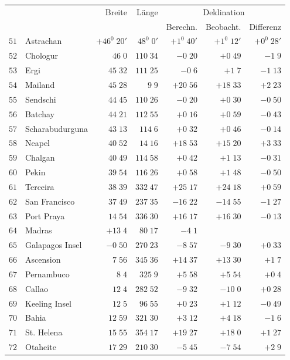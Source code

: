 \clearpage
{}
\begingroup
\fontsize{9}{10.2}\selectfont
\setlength{\tabcolsep}{2.5pt}
\renewcommand{\arraystretch}{1.02}
\begin{center}
\begin{tabular}{rl|r|r||r|r|r}
\hline
&&Breite&Länge&\multicolumn{3}{c}{Deklination}\\
&&&&Berechn.&Beobacht.&Differenz\\\hline
$51$&Astrachan&$+46^0\;20'$&$48^0\;0'$&$+1^0\;40'$&$+1^0\;12'$&$+0^0\;28'$\\
$52$&Chologur&$46\;0$&$110\;34$&$-0\;20$&$+0\;49$&$-1\;9$\\
$53$&Ergi&$45\;32$&$111\;25$&$-0\;6$&$+1\;7$&$-1\;13$\\
$54$&Mailand&$45\;28$&$9\;9$&$+20\;56$&$+18\;33$&$+2\;23$\\
$55$&Sendschi&$44\;45$&$110\;26$&$-0\;20$&$+0\;30$&$-0\;50$\\
$56$&Batchay&$44\;21$&$112\;55$&$+0\;16$&$+0\;59$&$-0\;43$\\
$57$&Scharabudurguna&$43\;13$&$114\;6$&$+0\;32$&$+0\;46$&$-0\;14$\\
$58$&Neapel&$40\;52$&$14\;16$&$+18\;53$&$+15\;20$&$+3\;33$\\
$59$&Chalgan&$40\;49$&$114\;58$&$+0\;42$&$+1\;13$&$-0\;31$\\
$60$&Pekin&$39\;54$&$116\;26$&$+0\;58$&$+1\;48$&$-0\;50$\\[2pt]
$61$&Terceira&$38\;39$&$332\;47$&$+25\;17$&$+24\;18$&$+0\;59$\\
$62$&San Francisco&$37\;49$&$237\;35$&$-16\;22$&$-14\;55$&$-1\;27$\\
$63$&Port Praya&$14\;54$&$336\;30$&$+16\;17$&$+16\;30$&$-0\;13$\\
$64$&Madras&$+13\;4$&$80\;17$&$-4\;1$&&\\
$65$&Galapagos Insel&$-0\;50$&$270\;23$&$-8\;57$&$-9\;30$&$+0\;33$\\
$66$&Ascension&$7\;56$&$345\;36$&$+14\;37$&$+13\;30$&$+1\;7$\\
$67$&Pernambuco&$8\;4$&$325\;9$&$+5\;58$&$+5\;54$&$+0\;4$\\
$68$&Callao&$12\;4$&$282\;52$&$-9\;32$&$-10\;0$&$+0\;28$\\
$69$&Keeling Insel&$12\;5$&$96\;55$&$+0\;23$&$+1\;12$&$-0\;49$\\
$70$&Bahia&$12\;59$&$321\;30$&$+3\;12$&$+4\;18$&$-1\;6$\\[2pt]
$71$&St. Helena&$15\;55$&$354\;17$&$+19\;27$&$+18\;0$&$+1\;27$\\
$72$&Otaheite&$17\;29$&$210\;30$&$-5\;45$&$-7\;54$&$+2\;9$\\

\end{tabular}
\end{center}
